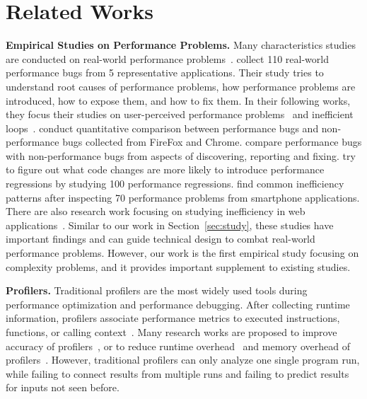 
\section{Related Works}
\label{sec:related}

\noindent\textbf{Empirical Studies on Performance Problems.}
Many characteristics studies are conducted on real-world performance
problems~\cite{PerfBug,SongOOPSLA2014,ldoctor,Zaman2012MSR,Nistor2013MSR,HuangRegression,SmartphoneStudy,junwen-1, junwen-2}.
\citet{PerfBug} collect 110 real-world performance bugs from 
5 representative applications.
Their study tries to understand root causes of performance problems,
how performance problems are introduced, 
how to expose them, and how to fix them.
In their following works, they focus their studies on
user-perceived performance problems~\cite{SongOOPSLA2014}
and inefficient loops~\cite{ldoctor}.
\citet{Zaman2012MSR} conduct quantitative comparison between performance bugs
and non-performance bugs collected from FireFox and Chrome.
\citet{Nistor2013MSR} compare performance bugs with non-performance bugs
from aspects of discovering, reporting and fixing.
\citet{HuangRegression} try to figure out what code changes are 
more likely to introduce performance regressions by
studying 100 performance regressions.
\citet{SmartphoneStudy} find common inefficiency patterns after
inspecting 70 performance problems from smartphone applications.
There are also research work focusing on studying inefficiency 
in web applications~\cite{junwen-1, junwen-2}.
Similar to our work in Section~\ref{sec:study},
these studies have important findings and can guide technical design to combat
real-world performance problems.
However, our work is the first empirical study focusing on complexity problems,
and it provides important supplement to existing studies.


\noindent\textbf{Profilers.}
Traditional profilers are the most widely used tools
during performance optimization and performance debugging.
After collecting runtime information,
profilers associate performance metrics to executed instructions,
functions, or calling context~\cite{oprofile,gprof, CCT}.
Many research works are proposed to improve
accuracy of profilers~\cite{4Profilers, LagHunter, AppInsight}, or
to reduce runtime overhead~\cite{AdaptiveBurst}
and memory overhead of profilers~\cite{HotCallingContext}.
However, traditional profilers can only analyze one single program run,
while failing to connect results from multiple runs and failing to
predict results for inputs not seen before.


